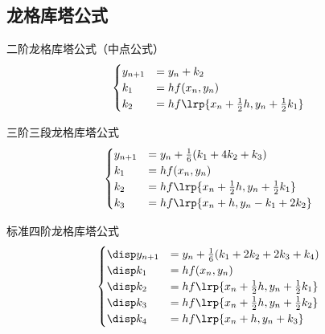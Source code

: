 \subsection{龙格库塔公式}
二阶龙格库塔公式（中点公式）
\[\begin{cases}
    y_{n+1}&=y_n+k_2\\
    k_1&=hf(x_n,y_n)\\
    k_2&=hf\lrp{x_n+\frac{1}{2}h,y_n+\frac{1}{2}k_1}
\end{cases}\]

三阶三段龙格库塔公式
\[\begin{cases}
    y_{n+1}&=y_n+\frac{1}{6}(k_1+4k_2+k_3)\\
    k_1&=hf(x_n,y_n)\\
    k_2&=hf\lrp{x_n+\frac{1}{2}h,y_n+\frac{1}{2}k_1}\\
    k_3&=hf\lrp{x_n+h,y_n-k_1+2k_2}
\end{cases}\]

标准四阶龙格库塔公式
\[\begin{cases}
    \disp y_{n+1}&=y_n+\frac{1}{6}(k_1+2k_2+2k_3+k_4)\\
    \disp k_1&=hf(x_n,y_n)\\
    \disp k_2&=hf\lrp{x_n+\frac{1}{2}h,y_n+\frac{1}{2}k_1}\\
    \disp k_3&=hf\lrp{x_n+\frac{1}{2}h,y_n+\frac{1}{2}k_2}\\
    \disp k_4&=hf\lrp{x_n+h,y_n+k_3}
\end{cases}\]